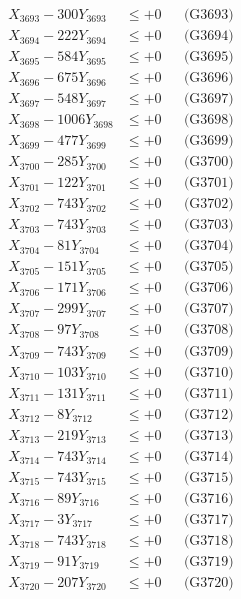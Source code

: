 \documentclass[a4paper,10pt]{article}
\begin{document}
{\begin{align}
X_{3693} - 300Y_{3693} &\leq +0 && \text{(G3693)} \\
X_{3694} - 222Y_{3694} &\leq +0 && \text{(G3694)} \\
X_{3695} - 584Y_{3695} &\leq +0 && \text{(G3695)} \\
X_{3696} - 675Y_{3696} &\leq +0 && \text{(G3696)} \\
X_{3697} - 548Y_{3697} &\leq +0 && \text{(G3697)} \\
X_{3698} - 1006Y_{3698} &\leq +0 && \text{(G3698)} \\
X_{3699} - 477Y_{3699} &\leq +0 && \text{(G3699)} \\
X_{3700} - 285Y_{3700} &\leq +0 && \text{(G3700)} \\
\allowbreak
X_{3701} - 122Y_{3701} &\leq +0 && \text{(G3701)} \\
X_{3702} - 743Y_{3702} &\leq +0 && \text{(G3702)} \\
X_{3703} - 743Y_{3703} &\leq +0 && \text{(G3703)} \\
X_{3704} - 81Y_{3704} &\leq +0 && \text{(G3704)} \\
X_{3705} - 151Y_{3705} &\leq +0 && \text{(G3705)} \\
X_{3706} - 171Y_{3706} &\leq +0 && \text{(G3706)} \\
X_{3707} - 299Y_{3707} &\leq +0 && \text{(G3707)} \\
X_{3708} - 97Y_{3708} &\leq +0 && \text{(G3708)} \\
X_{3709} - 743Y_{3709} &\leq +0 && \text{(G3709)} \\
X_{3710} - 103Y_{3710} &\leq +0 && \text{(G3710)} \\
\allowbreak
X_{3711} - 131Y_{3711} &\leq +0 && \text{(G3711)} \\
X_{3712} - 8Y_{3712} &\leq +0 && \text{(G3712)} \\
X_{3713} - 219Y_{3713} &\leq +0 && \text{(G3713)} \\
X_{3714} - 743Y_{3714} &\leq +0 && \text{(G3714)} \\
X_{3715} - 743Y_{3715} &\leq +0 && \text{(G3715)} \\
X_{3716} - 89Y_{3716} &\leq +0 && \text{(G3716)} \\
X_{3717} - 3Y_{3717} &\leq +0 && \text{(G3717)} \\
X_{3718} - 743Y_{3718} &\leq +0 && \text{(G3718)} \\
X_{3719} - 91Y_{3719} &\leq +0 && \text{(G3719)} \\
X_{3720} - 207Y_{3720} &\leq +0 && \text{(G3720)} \\

\end{align}}
\end{document}
